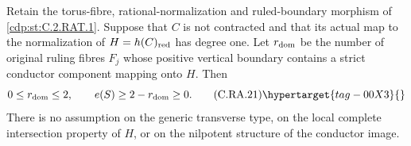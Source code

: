 \begin{proposition}\hypertarget{tag-01CF}{}\label{cdp:st:C.2.RAT.3}


Retain the torus-fibre, rational-normalization and ruled-boundary
morphism of \ref{cdp:st:C.2.RAT.1}. Suppose that $C$ is not contracted and
that its actual map to the normalization of
$H=h(C)_{\rm red}$ has degree one. Let $r_{\rm dom}$ be the
number of original ruling fibres $F_j$ whose positive vertical
boundary contains a strict conductor component mapping onto
$H$. Then
\[
       0\le r_{\rm dom}\le2,\qquad
       e(S)\ge2-r_{\rm dom}\ge0.
\tag{C.RA.21}\hypertarget{tag-00X3}{}\label{cdp:eq:C.RA.21}
\]
There is no assumption on the generic transverse type, on the
local complete intersection property of $H$, or on the
nilpotent structure of the conductor image.
\end{proposition}

